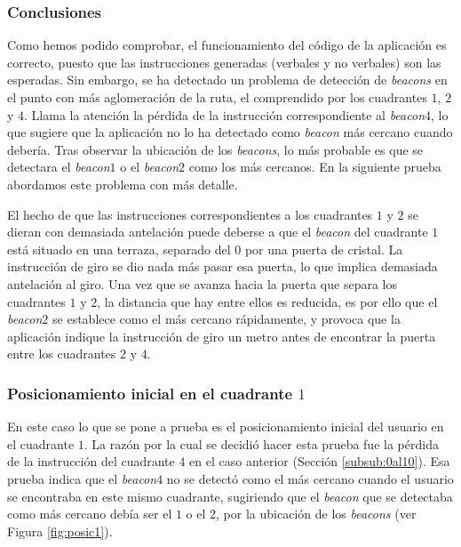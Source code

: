 \subsubsection*{Conclusiones}

Como hemos podido comprobar, el funcionamiento del código de la aplicación es correcto, puesto que las instrucciones generadas (verbales y no verbales) son las esperadas. Sin embargo, se ha detectado un problema de detección de \textit{beacons} en el punto con más aglomeración de la ruta, el comprendido por los cuadrantes $1$, $2$ y $4$. Llama la atención la pérdida de la instrucción correspondiente al \textit{beacon$4$}, lo que sugiere que la aplicación no lo ha detectado como \textit{beacon} más cercano cuando debería. Tras observar la ubicación de los \textit{beacons}, lo más probable es que se detectara el \textit{beacon$1$} o el \textit{beacon$2$} como los más cercanos. En la siguiente prueba abordamos este problema con más detalle. 

El hecho de que las instrucciones correspondientes a los cuadrantes $1$ y $2$ se dieran con demasiada antelación puede deberse a que el \textit{beacon} del cuadrante $1$ está situado en una terraza, separado del $0$ por una puerta de cristal. La instrucción de giro se dio nada más pasar esa puerta, lo que implica demasiada antelación al giro. Una vez que se avanza hacia la puerta que separa los cuadrantes $1$ y $2$, la distancia que hay entre ellos es reducida, es por ello que el \textit{beacon$2$} se establece como el más cercano rápidamente, y provoca que la aplicación indique la instrucción de giro un metro antes de encontrar la puerta entre los cuadrantes $2$ y $4$.


\subsubsection{Posicionamiento inicial en el cuadrante $1$}
\label{subsub:pos1}

En este caso lo que se pone a prueba es el posicionamiento inicial del usuario en el cuadrante $1$. La razón por la cual se decidió hacer esta prueba fue la pérdida de la instrucción del cuadrante $4$ en el caso anterior (Sección \ref{subsub:0al10}). Esa prueba indica que el \textit{beacon$4$} no se detectó como el más cercano cuando el usuario se encontraba en este mismo cuadrante, sugiriendo que el \textit{beacon} que se detectaba como más cercano debía ser el $1$ o el $2$, por la ubicación de los \textit{beacons} (ver Figura \ref{fig:posic1}).


